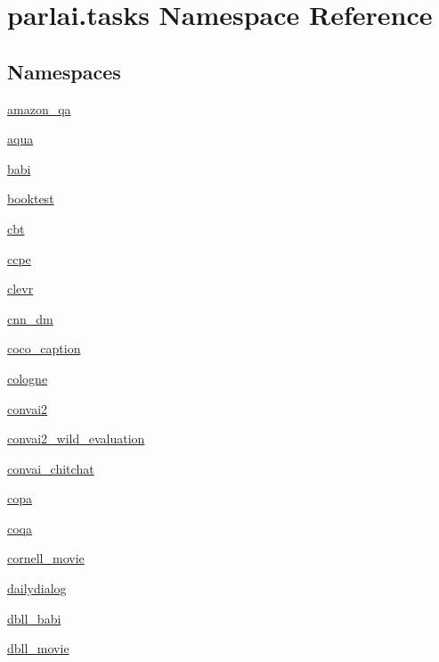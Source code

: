 \hypertarget{namespaceparlai_1_1tasks}{}\section{parlai.\+tasks Namespace Reference}
\label{namespaceparlai_1_1tasks}
\subsection*{Namespaces}
\begin{DoxyCompactItemize}
\item 
 \hyperlink{namespaceparlai_1_1tasks_1_1amazon__qa}{amazon\+\_\+qa}
\item 
 \hyperlink{namespaceparlai_1_1tasks_1_1aqua}{aqua}
\item 
 \hyperlink{namespaceparlai_1_1tasks_1_1babi}{babi}
\item 
 \hyperlink{namespaceparlai_1_1tasks_1_1booktest}{booktest}
\item 
 \hyperlink{namespaceparlai_1_1tasks_1_1cbt}{cbt}
\item 
 \hyperlink{namespaceparlai_1_1tasks_1_1ccpe}{ccpe}
\item 
 \hyperlink{namespaceparlai_1_1tasks_1_1clevr}{clevr}
\item 
 \hyperlink{namespaceparlai_1_1tasks_1_1cnn__dm}{cnn\+\_\+dm}
\item 
 \hyperlink{namespaceparlai_1_1tasks_1_1coco__caption}{coco\+\_\+caption}
\item 
 \hyperlink{namespaceparlai_1_1tasks_1_1cologne}{cologne}
\item 
 \hyperlink{namespaceparlai_1_1tasks_1_1convai2}{convai2}
\item 
 \hyperlink{namespaceparlai_1_1tasks_1_1convai2__wild__evaluation}{convai2\+\_\+wild\+\_\+evaluation}
\item 
 \hyperlink{namespaceparlai_1_1tasks_1_1convai__chitchat}{convai\+\_\+chitchat}
\item 
 \hyperlink{namespaceparlai_1_1tasks_1_1copa}{copa}
\item 
 \hyperlink{namespaceparlai_1_1tasks_1_1coqa}{coqa}
\item 
 \hyperlink{namespaceparlai_1_1tasks_1_1cornell__movie}{cornell\+\_\+movie}
\item 
 \hyperlink{namespaceparlai_1_1tasks_1_1dailydialog}{dailydialog}
\item 
 \hyperlink{namespaceparlai_1_1tasks_1_1dbll__babi}{dbll\+\_\+babi}
\item 
 \hyperlink{namespaceparlai_1_1tasks_1_1dbll__movie}{dbll\+\_\+movie}

\end{DoxyCompactItemize}
